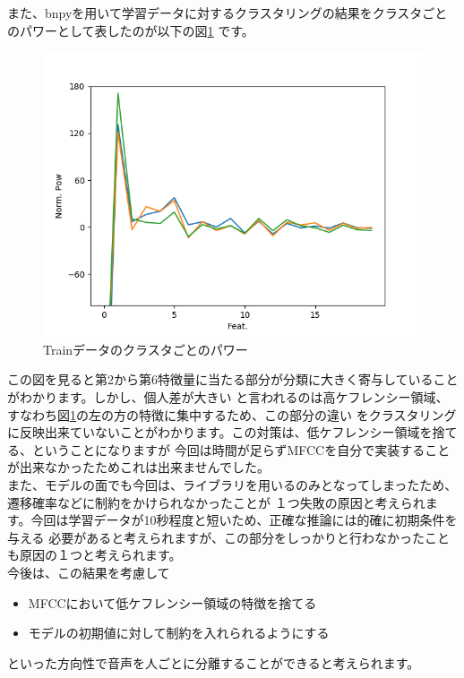 \documentclass[10pt,a4paper]{ltjsarticle}       %
\begin{document}
また、bnpyを用いて学習データに対するクラスタリングの結果をクラスタごとのパワーとして表したのが以下の図\ref{fig:power}
です。
\begin{figure}
  \begin{center}
    \includegraphics[clip, scale=0.80]{normpVSfeat}
    \caption{Trainデータのクラスタごとのパワー}
    \label{fig:power}
  \end{center}
\end{figure}
この図を見ると第2から第6特徴量に当たる部分が分類に大きく寄与していることがわかります。しかし、個人差が大きい
と言われるのは高ケフレンシー領域、すなわち図\ref{fig:power}の左の方の特徴に集中するため、この部分の違い
をクラスタリングに反映出来ていないことがわかります。この対策は、低ケフレンシー領域を捨てる、ということになりますが
今回は時間が足らずMFCCを自分で実装することが出来なかったためこれは出来ませんでした。\\

また、モデルの面でも今回は、ライブラリを用いるのみとなってしまったため、遷移確率などに制約をかけられなかったことが
１つ失敗の原因と考えられます。今回は学習データが10秒程度と短いため、正確な推論には的確に初期条件を与える
必要があると考えられますが、この部分をしっかりと行わなかったことも原因の１つと考えられます。\\

今後は、この結果を考慮して
\begin{itemize}
  \item MFCCにおいて低ケフレンシー領域の特徴を捨てる
  \item モデルの初期値に対して制約を入れられるようにする
\end{itemize}
といった方向性で音声を人ごとに分離することができると考えられます。


\end{document}
